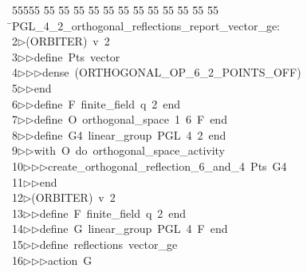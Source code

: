 %
%
\begin{tabbing}
55555 \= 55 \= 55 \= 55 \= 55 \= 55 \= 55 \= 55 \= 55 \= 55 \= 55 \= 55 \= 55 \= \>PGL\_4\_2\_orthogonal\_reflections\_report\_vector\_ge:\\[0pt]
2\>$\triangleright$\>(ORBITER)\ v\ 2\ \\[0pt]
3\>$\triangleright$\>$\triangleright$\>define\ Pts\ vector\ \\[0pt]
4\>$\triangleright$\>$\triangleright$\>$\triangleright$\>dense\ (ORTHOGONAL\_OP\_6\_2\_POINTS\_OFF)\ \\[0pt]
5\>$\triangleright$\>$\triangleright$\>end\ \\[0pt]
6\>$\triangleright$\>$\triangleright$\>define\ F\ finite\_field\ q\ 2\ end\ \\[0pt]
7\>$\triangleright$\>$\triangleright$\>define\ O\ orthogonal\_space\ 1\ 6\ F\ end\ \\[0pt]
8\>$\triangleright$\>$\triangleright$\>define\ G4\ linear\_group\ PGL\ 4\ 2\ end\ \\[0pt]
9\>$\triangleright$\>$\triangleright$\>with\ O\ do\ orthogonal\_space\_activity\ \\[0pt]
10\>$\triangleright$\>$\triangleright$\>$\triangleright$\>create\_orthogonal\_reflection\_6\_and\_4\ Pts\ G4\ \\[0pt]
11\>$\triangleright$\>$\triangleright$\>end\\[0pt]
12\>$\triangleright$\>(ORBITER)\ v\ 2\ \\[0pt]
13\>$\triangleright$\>$\triangleright$\>define\ F\ finite\_field\ q\ 2\ end\ \\[0pt]
14\>$\triangleright$\>$\triangleright$\>define\ G\ linear\_group\ PGL\ 4\ F\ end\ \\[0pt]
15\>$\triangleright$\>$\triangleright$\>define\ reflections\ vector\_ge\ \\[0pt]
16\>$\triangleright$\>$\triangleright$\>$\triangleright$\>action\ G\ \\[0pt]

\end{tabbing}
